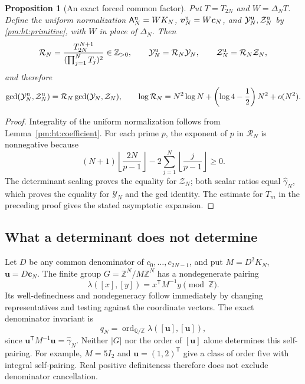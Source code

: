 \documentclass[11pt,a4paper]{article}
\newcommand{\Q}{\mathbb Q}
\newcommand{\Z}{\mathbb Z}
\newtheorem{proposition}[theorem]{Proposition}
\theoremstyle{definition}
\theoremstyle{remark}
\numberwithin{equation}{section}
\begin{document}
\begin{proposition}[An exact forced common factor]\label{pm:ht:gcd}
Put $T=T_{2N}$ and $W=\Delta_NT$.  Define the uniform normalization
$\mathsf A_N^{\rm u}=WK_N$, $\boldsymbol v_N^{\rm u}=W\boldsymbol c_N$,
and $\mathcal Y_N^{\rm u},\mathcal Z_N^{\rm u}$ by \eqref{pm:ht:primitive}, with $W$
in place of $\Delta_N$.  Then
\[
 \mathcal R_N=\frac{T_{2N}^{N+1}}{(\prod_{j=1}^NT_j)^2}\in\Z_{>0},
 \qquad \mathcal Y_N^{\rm u}=\mathcal R_N\mathcal Y_N,
 \qquad \mathcal Z_N^{\rm u}=\mathcal R_N\mathcal Z_N,
\]
and therefore
\[
 \gcd(\mathcal Y_N^{\rm u},\mathcal Z_N^{\rm u})
 =\mathcal R_N\gcd(\mathcal Y_N,\mathcal Z_N),\qquad
 \log\mathcal R_N=N^2\log N+
       \left(\log4-\frac12\right)N^2+o(N^2).
\]
\end{proposition}
\begin{proof}
Integrality of the uniform normalization follows from
Lemma~\ref{pm:ht:coefficient}.  For each prime $p$, the exponent of
$p$ in $\mathcal R_N$ is nonnegative because
\[
 (N+1)\left\lfloor\frac{2N}{p-1}\right\rfloor
 -2\sum_{j=1}^N\left\lfloor\frac j{p-1}\right\rfloor\geq0.
\]
The determinant scaling proves the equality for $\mathcal Z_N$;
both scalar ratios equal $\widehat\gamma_N$, which proves the equality
for $\mathcal Y_N$ and the gcd identity.  The estimate for $T_m$ in the preceding proof gives
the stated asymptotic expansion.
\end{proof}

\subsection{What a determinant does not determine}

Let $D$ be any common denominator of $c_0,\ldots,c_{2N-1}$, and put
$M=D^2K_N$, $\boldsymbol u=D\boldsymbol c_N$.  The finite group
$G=\Z^N/M\Z^N$ has a nondegenerate pairing
\[
 \lambda([x],[y])=x^{\mathsf T}M^{-1}y\pmod\Z.
\]
Its well-definedness and nondegeneracy follow immediately by
changing representatives and testing against the coordinate vectors.
The exact denominator invariant is
\begin{equation}\label{pm:ht:self-pairing}
 q_N=\operatorname{ord}_{\Q/\Z}\lambda([\boldsymbol u],[\boldsymbol u]),
\end{equation}
since $\boldsymbol u^{\mathsf T}M^{-1}\boldsymbol u=\widehat\gamma_N$.
Neither $|G|$ nor the order of $[\boldsymbol u]$ alone determines
this self-pairing.  For example, $M=5I_2$ and
$\boldsymbol u=(1,2)^{\mathsf T}$ give a class of order five with
integral self-pairing.  Real positive definiteness therefore does
not exclude denominator cancellation.
\end{document}
